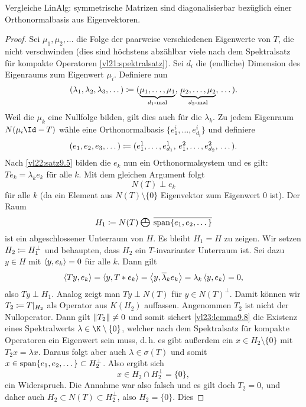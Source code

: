 \nnBemerkung Vergleiche LinAlg: symmetrische Matrizen sind diagonalisierbar
bezüglich einer Orthonormalbasis aus Eigenvektoren.

\begin{proof}
    Sei $\mu_1,\mu_2,\dots$ die Folge der paarweise verschiedenen Eigenwerte
    von $T$, die nicht verschwinden (dies sind höchstens abzählbar viele nach dem
    Spektralsatz für kompakte Operatoren \ref{vl21:spektralsatz}). Sei
    $d_i$ die (endliche) Dimension des Eigenraums zum Eigenwert $\mu_i$.
    Definiere nun
    \[ (\lambda_1,\lambda_2,\lambda_3,\dots)
        \coloneqq (\underbrace{\mu_1,\dots,\mu_1}_{d_1\text{-mal}},\,
                \underbrace{\mu_2,\dots,\mu_2}_{d_2\text{-mal}},\,
                \dots)
    . \]
    Weil die $\mu_k$ eine Nullfolge bilden, gilt dies auch für die $\lambda_k$.
    Zu jedem Eigenraum $N(\mu_i\Id-T)$ wähle eine Orthonormalbasis
    $\{e_1^i,\dots,e_{d_i}^i\}$ und definiere
    \[ (e_1,e_2,e_3,\dots)
        \coloneqq (e_1^1,\dots,e_{d_1}^1,\, e_1^2,\dots,e_{d_2}^2,\, \dots)
    . \]
    Nach \cref{vl22:satz9.5} bilden die $e_k$ nun ein Orthonormalsystem und es
    gilt: $Te_k = \lambda_k e_k$ für alle $k$. Mit dem gleichen Argument folgt
    \[ N(T) \perp e_k \]
    für alle $k$ (da ein Element aus $N(T)\setminus\{0\}$ Eigenvektor zum
    Eigenwert $0$ ist). Der Raum
    \[ H_1 \defeq
        N(T) \;\texthilbertsumsymbol\; \setclosure{\spann\{e_1,e_2,\dots\}} 
    \]
    ist ein abgeschlossener Unterraum von $H$. Es bleibt $H_1 = H$ zu zeigen.
    Wir setzen $H_2 \coloneqq H_1^\perp$ und behaupten, dass $H_2$ ein
    $T$-invarianter Unterraum ist. Sei dazu $y\in H$ mit
    $\SP{y,e_k} = 0$ für alle $k$. Dann gilt
    \[ \SP{Ty,e_k} = \SP{y,T*e_k} = \SP{y,\ol{\lambda}_k e_k}
        = \lambda_k \, \SP{y,e_k} = 0
    , \]
    also $Ty \perp H_1$. Analog zeigt man $Ty \perp N(T)$ für $y\in N(T)^\perp$.
    Damit können wir $T_2\coloneqq T\vert_{H_2}$ als Operator aus $K(H_2)$
    auffassen. Angenommen $T_2$ ist nicht der Nulloperator. Dann gilt
    $\lVert T_2\rVert\neq0$ und somit sichert \cref{vl23:lemma9.8} die Existenz eines
    Spektralwerts $\lambda\in\K\setminus\{0\}$, welcher nach dem Spektralsatz für
    kompakte Operatoren  ein Eigenwert sein muss,
    d.\,h. es gibt außerdem ein $x\in H_2\setminus\{0\}$ mit $T_2x=\lambda x$.
    Daraus folgt aber auch $\lambda\in\sigma(T)$ und somit
    $x\in\operatorname{span}\{e_1,e_2,\dots\} \subset H_2^\perp$. Also ergibt sich
    \[ x\in H_2 \cap H_2^\perp = \{0\}  , \]
    ein Widerspruch. Die Annahme war also falsch und es gilt doch $T_2=0$, und
    daher auch $H_2\subset N(T) \subset H_2^\perp$, also $H_2 = \{0\}$. Dies

\end{proof}

